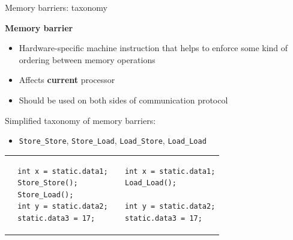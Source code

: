 \begin{frame}[fragile]{Memory barriers: taxonomy}

\textbf{Memory barrier}
\begin{itemize}
    \item Hardware-specific machine instruction that helps to enforce some kind of ordering between memory operations 
    \item Affects \textbf{current} processor
    \item Should be used on both sides of communication protocol
\end{itemize}

\pause

Simplified taxonomy of memory barriers:
\begin{itemize}
    \item \texttt{Store\_Store}, \texttt{Store\_Load}, \texttt{Load\_Store}, \texttt{Load\_Load}
\end{itemize}

\pause

\begin{tabular}{p{8cm}p{5cm}}

\begin{verbatim}
  int x = static.data1;
  Store_Store();
  Store_Load();
  int y = static.data2;
  static.data3 = 17;
\end{verbatim}

 &

 \begin{verbatim}
  int x = static.data1;
  Load_Load();

  int y = static.data2;
  static.data3 = 17;
\end{verbatim}

\end{tabular}

\end{frame}


